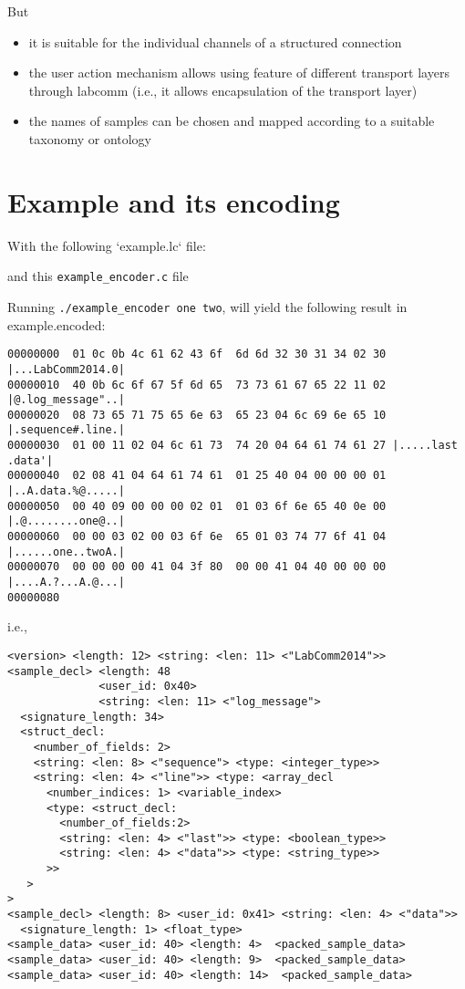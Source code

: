 \documentclass[a4paper]{article}
\begin{document}
But

\begin{itemize}
\item it is suitable for the individual channels of a structured connection
\item the user action mechanism allows using feature of different transport layers
  through labcomm (i.e., it allows encapsulation of the transport layer)
\item the names of samples can be chosen and mapped according to a suitable taxonomy or ontology
\end{itemize}



\section{Example and its encoding}

With the following `example.lc` file:


and this \verb+example_encoder.c+ file


\newpage

Running \verb+./example_encoder one two+, will yield the following result in example.encoded:
\begin{verbatim}
00000000  01 0c 0b 4c 61 62 43 6f  6d 6d 32 30 31 34 02 30 |...LabComm2014.0|
00000010  40 0b 6c 6f 67 5f 6d 65  73 73 61 67 65 22 11 02 |@.log_message"..|
00000020  08 73 65 71 75 65 6e 63  65 23 04 6c 69 6e 65 10 |.sequence#.line.|
00000030  01 00 11 02 04 6c 61 73  74 20 04 64 61 74 61 27 |.....last .data'|
00000040  02 08 41 04 64 61 74 61  01 25 40 04 00 00 00 01 |..A.data.%@.....|
00000050  00 40 09 00 00 00 02 01  01 03 6f 6e 65 40 0e 00 |.@........one@..|
00000060  00 00 03 02 00 03 6f 6e  65 01 03 74 77 6f 41 04 |......one..twoA.|
00000070  00 00 00 00 41 04 3f 80  00 00 41 04 40 00 00 00 |....A.?...A.@...|
00000080
\end{verbatim}

i.e.,
\begin{verbatim}
<version> <length: 12> <string: <len: 11> <"LabComm2014">>
<sample_decl> <length: 48 
              <user_id: 0x40> 
              <string: <len: 11> <"log_message">
  <signature_length: 34>
  <struct_decl:
    <number_of_fields: 2>
    <string: <len: 8> <"sequence"> <type: <integer_type>>
    <string: <len: 4> <"line">> <type: <array_decl
      <number_indices: 1> <variable_index>
      <type: <struct_decl:
        <number_of_fields:2>
        <string: <len: 4> <"last">> <type: <boolean_type>>
        <string: <len: 4> <"data">> <type: <string_type>>
      >>
   >
>
<sample_decl> <length: 8> <user_id: 0x41> <string: <len: 4> <"data">>
  <signature_length: 1> <float_type>
<sample_data> <user_id: 40> <length: 4>  <packed_sample_data>
<sample_data> <user_id: 40> <length: 9>  <packed_sample_data>
<sample_data> <user_id: 40> <length: 14>  <packed_sample_data>
\end{verbatim}
\end{document}
